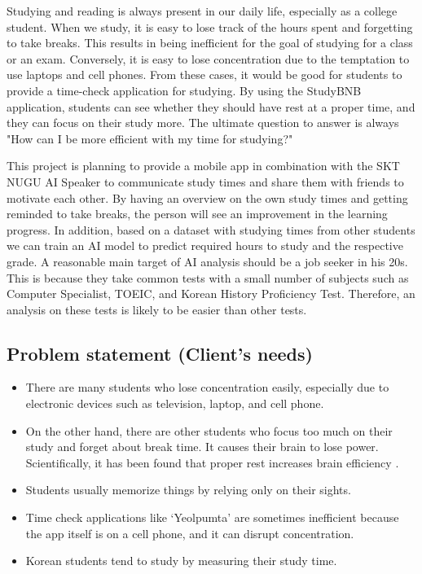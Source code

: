 \documentclass[conference]{IEEEtran}
\begin{document}
Studying and reading is always present in our daily life, especially as a college student. When we study, it is easy to lose track of the hours spent and forgetting to take breaks. This results in being inefficient for the goal of studying for a class or an exam. Conversely, it is easy to lose concentration due to the temptation to use laptops and cell phones. From these cases, it would be good for students to provide a time-check application for studying. By using the StudyBNB application, students can see whether they should have rest at a proper time, and they can focus on their study more. The ultimate question to answer is always "How can I be more efficient with my time for studying?"

This project is planning to provide a mobile app in combination with the SKT NUGU AI Speaker to communicate study times and share them with friends to motivate each other. By having an overview on the own study times and getting reminded to take breaks, the person will see an improvement in the learning progress. In addition, based on a dataset with studying times from other students we can train an AI model to predict required hours to study and the respective grade. A reasonable main target of AI analysis should be a job seeker in his 20s. This is because they take common tests with a small number of subjects such as Computer Specialist, TOEIC, and Korean History Proficiency Test. Therefore, an analysis on these tests is likely to be easier than other tests.

\subsection{Problem statement (Client's needs)}

\begin{itemize}
\item There are many students who lose concentration easily, especially due to electronic devices such as television, laptop, and cell phone.
\item On the other hand, there are other students who focus too much on their study and forget about break time. It causes their brain to lose power. Scientifically, it has been found that proper rest increases brain efficiency \cite{b1}.
\item Students usually memorize things by relying only on their sights.
\item Time check applications like ‘Yeolpumta’ are sometimes inefficient because the app itself is on a cell phone, and it can disrupt concentration.
\item Korean students tend to study by measuring their study time.
\end{itemize}
\end{document}
